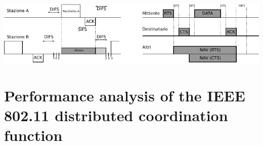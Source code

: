 \vspace{5mm}
\includegraphics{images/img1.pdf}
%

\section{Performance analysis of the IEEE 802.11 distributed coordination function}
